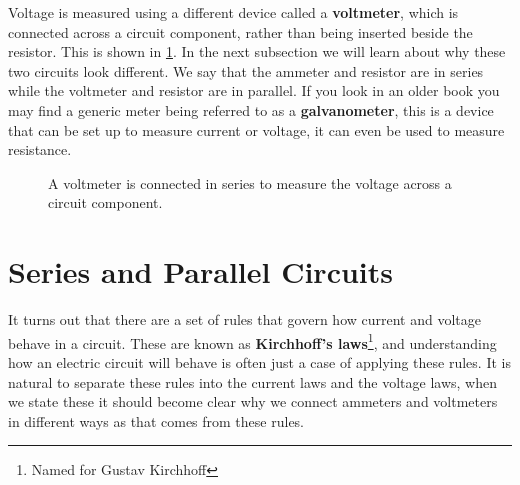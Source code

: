 \documentclass[a4paper,12pt]{book}
\begin{document}
Voltage is measured using a different device called a \textbf{voltmeter}, which is connected across a circuit component, rather than  being inserted beside the resistor. This is shown in \cref{fig: voltmeter}. In the next subsection we will learn about why these two circuits look different. We say that the ammeter and resistor are in series while the voltmeter and resistor are in parallel. If you look in an older book you may find a generic meter being referred to as a \textbf{galvanometer}, this is a device that can be set up to measure current or voltage, it can even be used to measure resistance. 

\begin{figure}[ht]
    \centering
    \caption{A voltmeter is connected in series to measure the voltage across a circuit component.}
    \label{fig: voltmeter}
\end{figure}

\section{Series and Parallel Circuits}
It turns out that there are a set of rules that govern how current and voltage behave in a circuit. These are known as \textbf{Kirchhoff's laws}\footnote{Named for Gustav Kirchhoff}, and understanding how an electric circuit will behave is often just a case of applying these rules. It is natural to separate these rules into the current laws and the voltage laws, when we state these it should become clear why we connect ammeters and voltmeters in different ways as that comes from these rules. \\
\end{document}
